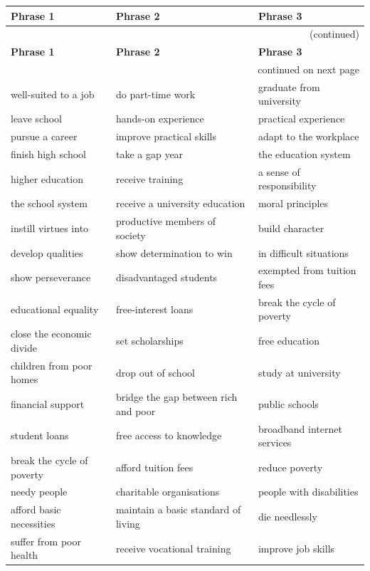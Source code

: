 \documentclass[10pt,a4paper]{article}
\begin{document}
\setlength{\tabcolsep}{8pt}
\renewcommand{\arraystretch}{1.3}
{\large
\begin{longtable}{@{}*{3}{p{}}@{}}
\toprule
\textbf{Phrase 1} & \textbf{Phrase 2} & \textbf{Phrase 3} \\ \midrule
\endfirsthead
\multicolumn{3}{r}{\footnotesize (continued)} \\
\toprule
\textbf{Phrase 1} & \textbf{Phrase 2} & \textbf{Phrase 3} \\ \midrule
\endhead
\midrule
\multicolumn{3}{r}{\footnotesize continued on next page} \\
\endfoot
\bottomrule
\endlastfoot
well-suited to a job & do part-time work & graduate from university \\
leave school & hands-on experience & practical experience \\
pursue a career & improve practical skills & adapt to the workplace \\
finish high school & take a gap year & the education system \\
higher education & receive training & a sense of responsibility \\
the school system & receive a university education & moral principles \\
instill virtues into & productive members of society & build character \\
develop qualities & show determination to win & in difficult situations \\
show perseverance & disadvantaged students & exempted from tuition fees \\
educational equality & free-interest loans & break the cycle of poverty \\
close the economic divide & set scholarships & free education \\
children from poor homes & drop out of school & study at university \\
financial support & bridge the gap between rich and poor & public schools \\
student loans & free access to knowledge & broadband internet services \\
break the cycle of poverty & afford tuition fees & reduce poverty \\
needy people & charitable organisations & people with disabilities \\
afford basic necessities & maintain a basic standard of living & die needlessly \\
suffer from poor health & receive vocational training & improve job skills \\

\end{longtable}}
\end{document}

